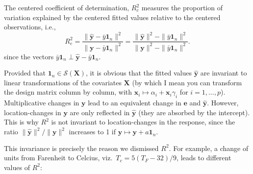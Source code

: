 \documentclass[]{book}
\newenvironment{Shaded}{\begin{snugshade}}{\end{snugshade}}
\newcommand{\CommentTok}[1]{\textcolor[rgb]{0.56,0.35,0.01}{\textit{#1}}}
\newcommand{\DataTypeTok}[1]{\textcolor[rgb]{0.13,0.29,0.53}{#1}}
\newcommand{\DecValTok}[1]{\textcolor[rgb]{0.00,0.00,0.81}{#1}}
\newcommand{\KeywordTok}[1]{\textcolor[rgb]{0.13,0.29,0.53}{\textbf{#1}}}
\newcommand{\NormalTok}[1]{#1}
\newcommand{\OperatorTok}[1]{\textcolor[rgb]{0.81,0.36,0.00}{\textbf{#1}}}
\newcommand{\StringTok}[1]{\textcolor[rgb]{0.31,0.60,0.02}{#1}}
\theoremstyle{definition}
\theoremstyle{definition}
\theoremstyle{definition}
\theoremstyle{remark}
\begin{document}
The centered coefficient of determination, \(R^2_c\) measures the proportion of variation explained by the centered fitted values relative to the centered observations, i.e.,
\[ R^2_c = \frac{\|\hat{\boldsymbol{y}}-\bar{y}\mathbf{1}_n\|^2}{\|\boldsymbol{y}-\bar{y}\mathbf{1}_n\|^2}=\frac{\|\hat{\boldsymbol{y}}\|^2-\|\bar{y}\mathbf{1}_n\|^2}{\|\boldsymbol{y}\|^2-\|\bar{y}\mathbf{1}_n\|^2}.\]
since the vectors \(\bar{y}\mathbf{1}_n \perp \hat{\boldsymbol{y}}-\bar{y}\mathbf{1}_n\).

Provided that \(\mathbf{1}_n \in \mathscr{S}(\mathbf{X})\), it is obvious that the fitted values \(\hat{\boldsymbol{y}}\) are invariant to linear transformations of the covariates \(\mathbf{X}\) (by which I mean you can transform the design matrix column by column, with \(\mathbf{x}_i \mapsto \alpha_i+\mathbf{x}_i\gamma_i\) for \(i=1, \ldots, p\)). Multiplicative changes in \(\boldsymbol{y}\) lead to an equivalent change in \(\boldsymbol{e}\) and \(\hat{\boldsymbol{y}}\). However, location-changes in \(\boldsymbol{y}\) are only reflected in \(\hat{\boldsymbol{y}}\) (they are absorbed by the intercept). This is why \(R^2\) is not invariant to location-changes in the response, since the ratio \(\|\hat{\boldsymbol{y}}\|^2/\|\boldsymbol{y}\|^2\) increases to 1 if \({\boldsymbol{y}}\mapsto {\boldsymbol{y}}+ a \mathbf{1}_n\).

This invariance is precisely the reason we dismissed \(R^2\). For example, a change of units from Farenheit to Celcius, viz.~\(T_c = 5 (T_F - 32)/9\), leads to different values of \(R^2\):

\begin{Shaded}
\end{Shaded}
\end{document}
